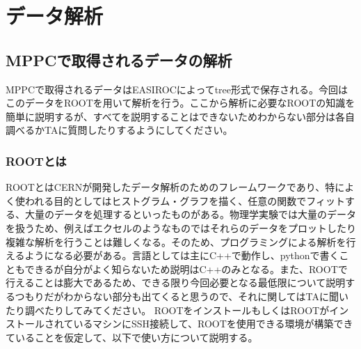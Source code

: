 \documentclass[10pt]{ujarticle}
\begin{document}
\section{データ解析}
\subsection{MPPCで取得されるデータの解析}
MPPCで取得されるデータはEASIROCによってtree形式で保存される。今回はこのデータをROOTを用いて解析を行う。ここから解析に必要なROOTの知識を簡単に説明するが、すべてを説明することはできないためわからない部分は各自調べるかTAに質問したりするようにしてください。

\subsubsection{ROOTとは}
ROOTとはCERNが開発したデータ解析のためのフレームワークであり、特によく使われる目的としてはヒストグラム・グラフを描く、任意の関数でフィットする、大量のデータを処理するといったものがある。物理学実験では大量のデータを扱うため、例えばエクセルのようなものではそれらのデータをプロットしたり複雑な解析を行うことは難しくなる。そのため、プログラミングによる解析を行えるようになる必要がある。言語としては主にC++で動作し、pythonで書くこともできるが自分がよく知らないため説明はC++のみとなる。また、ROOTで行えることは膨大であるため、できる限り今回必要となる最低限について説明するつもりだがわからない部分も出てくると思うので、それに関してはTAに聞いたり調べたりしてみてください。
ROOTをインストールもしくはROOTがインストールされているマシンにSSH接続して、ROOTを使用できる環境が構築できていることを仮定して、以下で使い方について説明する。
\end{document}
